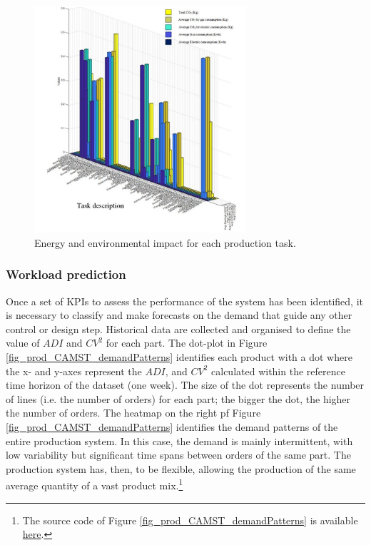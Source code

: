 \begin{figure}[hbt!]
\centering
\includegraphics[width=0.7\textwidth]{sectionProduction/control_figures/fig_prod_CAMST_performance2.png}
\captionsetup{type=figure}
\caption{Energy and environmental impact for each production task.}
\label{fig_prod_CAMST_performance2}
\end{figure}

\subsubsection{Workload prediction}
Once a set of KPIs to assess the performance of the system has been identified, it is necessary to classify and make forecasts on the demand that guide any other control or design step. Historical data are collected and organised to define the value of $ADI$ and $CV^2$ for each part. The dot-plot in Figure \ref{fig_prod_CAMST_demandPatterns} identifies each product with a dot where the x- and y-axes represent the $ADI$, and $CV^2$ calculated within the reference time horizon of the dataset (one week). The size of the dot represents the number of lines (i.e. the number of orders) for each part; the bigger the dot, the higher the number of orders. The heatmap on the right pf Figure \ref{fig_prod_CAMST_demandPatterns} identifies the demand patterns of the entire production system. In this case, the demand is mainly intermittent, with low variability but significant time spans between orders of the same part. The production system has, then, to be flexible, allowing the production of the same average quantity of a vast product mix.\footnote{The source code of Figure \ref{fig_prod_CAMST_demandPatterns} is available \href{https://github.com/aletuf93/logproj/blob/master/examples/PROD_02\%20Demand\%20patterns.ipynb}{here}.}

